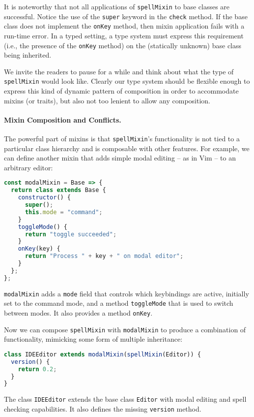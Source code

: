 It is noteworthy that not all applications of \lstinline{spellMixin} to base
classes are successful. Notice the use of the \lstinline{super} keyword in the
\lstinline{check} method. If the base class does not implement the
\lstinline{onKey} method, then mixin application fails with a run-time error. In
a typed setting, a type system must express this requirement (i.e., the presence of
the \lstinline{onKey} method) on the (statically unknown) base class being inherited.




We invite the readers to pause for a while and think about what the type of
\lstinline{spellMixin} would look like. Clearly our type system should be
flexible enough to express this kind of dynamic pattern of composition in order
to accommodate mixins (or traits), but also not too lenient to allow any
composition.


\paragraph{Mixin Composition and Conflicts.}
The powerful part of mixins is that \lstinline{spellMixin}'s functionality is not
tied to a particular class hierarchy and is composable with other features. For
example, we can define another mixin that adds simple modal editing -- as in Vim
-- to an arbitrary editor:
\begin{lstlisting}[language=JavaScript]
const modalMixin = Base => {
  return class extends Base {
    constructor() {
      super();
      this.mode = "command";
    }
    toggleMode() {
      return "toggle succeeded";
    }
    onKey(key) {
      return "Process " + key + " on modal editor";
    }
  };
};
\end{lstlisting}
\lstinline{modalMixin} adds a \lstinline{mode} field that controls which
keybindings are active, initially set to the command mode, and a method
\lstinline{toggleMode} that is used to switch between modes. It also provides a method \lstinline{onKey}.

Now we can compose \lstinline{spellMixin} with \lstinline{modalMixin} to produce
a combination of functionality, mimicking some form of multiple inheritance:
\begin{lstlisting}[language=JavaScript]
class IDEEditor extends modalMixin(spellMixin(Editor)) {
  version() {
    return 0.2;
  }
}
\end{lstlisting}
The class \lstinline{IDEEditor} extends the base class \lstinline{Editor} with
modal editing and spell checking capabilities. It also defines the missing
\lstinline{version} method.

